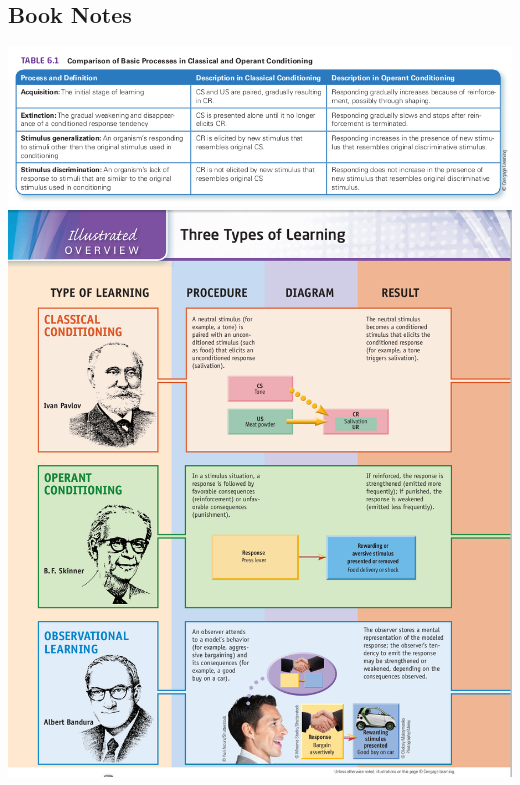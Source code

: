 \documentclass{article}
\begin{document}
\subsection{Book Notes}
\includegraphics[width=\textwidth]{process}
\includegraphics[width=\textwidth]{types}
\end{document}
